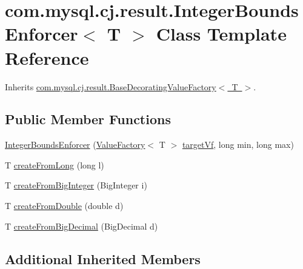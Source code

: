 \hypertarget{classcom_1_1mysql_1_1cj_1_1result_1_1_integer_bounds_enforcer}{}\section{com.\+mysql.\+cj.\+result.\+Integer\+Bounds\+Enforcer$<$ T $>$ Class Template Reference}
\label{classcom_1_1mysql_1_1cj_1_1result_1_1_integer_bounds_enforcer}


Inherits \mbox{\hyperlink{classcom_1_1mysql_1_1cj_1_1result_1_1_base_decorating_value_factory}{com.\+mysql.\+cj.\+result.\+Base\+Decorating\+Value\+Factory$<$ T $>$}}.

\subsection*{Public Member Functions}
\begin{DoxyCompactItemize}
\item 
\mbox{\hyperlink{classcom_1_1mysql_1_1cj_1_1result_1_1_integer_bounds_enforcer_ad0d5333449e0fe420770afb261b141a7}{Integer\+Bounds\+Enforcer}} (\mbox{\hyperlink{interfacecom_1_1mysql_1_1cj_1_1result_1_1_value_factory}{Value\+Factory}}$<$ T $>$ \mbox{\hyperlink{classcom_1_1mysql_1_1cj_1_1result_1_1_base_decorating_value_factory_a64c2c62bd9906ec3af7fc62e58bf34b3}{target\+Vf}}, long min, long max)
\item 
T \mbox{\hyperlink{classcom_1_1mysql_1_1cj_1_1result_1_1_integer_bounds_enforcer_a7c096b3f99fcd5043d9fba39c621eec2}{create\+From\+Long}} (long l)
\item 
T \mbox{\hyperlink{classcom_1_1mysql_1_1cj_1_1result_1_1_integer_bounds_enforcer_a9f1986170774f7cd6d33fb0209863b60}{create\+From\+Big\+Integer}} (Big\+Integer i)
\item 
T \mbox{\hyperlink{classcom_1_1mysql_1_1cj_1_1result_1_1_integer_bounds_enforcer_af5d807e10e726b20661c10addd2261f2}{create\+From\+Double}} (double d)
\item 
T \mbox{\hyperlink{classcom_1_1mysql_1_1cj_1_1result_1_1_integer_bounds_enforcer_aefe5924797f489f611e7f40638c5e3d2}{create\+From\+Big\+Decimal}} (Big\+Decimal d)
\end{DoxyCompactItemize}
\subsection*{Additional Inherited Members}


